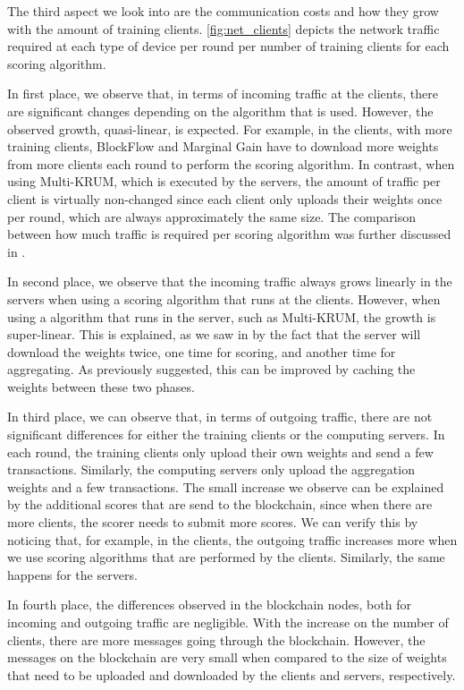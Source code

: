The third aspect we look into are the communication costs and how they grow with the amount of training clients. \autoref{fig:net_clients} depicts the network traffic required at each type of device per round per number of training clients for each scoring algorithm.

In first place, we observe that, in terms of incoming traffic at the clients, there are significant changes depending on the algorithm that is used. However, the observed growth, quasi-linear, is expected. For example, in the clients, with more training clients, BlockFlow and Marginal Gain have to download more weights from more clients each round to perform the scoring algorithm. In contrast, when using Multi-KRUM, which is executed by the servers, the amount of traffic per client is virtually non-changed since each client only uploads their weights once per round, which are always approximately the same size. The comparison between how much traffic is required per scoring algorithm was further discussed in .

In second place, we observe that the incoming traffic always grows linearly in the servers when using a scoring algorithm that runs at the clients. However, when using a algorithm that runs in the server, such as Multi-KRUM, the growth is super-linear. This is explained, as we saw in  by the fact that the server will download the weights twice, one time for scoring, and another time for aggregating. As previously suggested, this can be improved by caching the weights between these two phases.

In third place, we can observe that, in terms of outgoing traffic, there are not significant differences for either the training clients or the computing servers. In each round, the training clients only upload their own weights and send a few transactions. Similarly, the computing servers only upload the aggregation weights and a few transactions. The small increase we observe can be explained by the additional scores that are send to the blockchain, since when there are more clients, the scorer needs to submit more scores. We can verify this by noticing that, for example, in the clients, the outgoing traffic increases more when we use scoring algorithms that are performed by the clients. Similarly, the same happens for the servers.

In fourth place, the differences observed in the blockchain nodes, both for incoming and outgoing traffic are negligible. With the increase on the number of clients, there are more messages going through the blockchain. However, the messages on the blockchain are very small when compared to the size of weights that need to be uploaded and downloaded by the clients and servers, respectively. 

